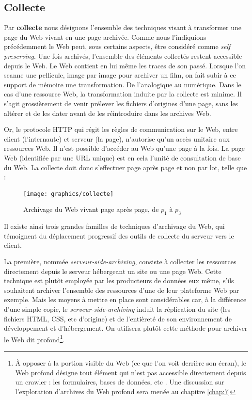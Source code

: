 \documentclass[symmetric,justified,marginals=raggedouter]{tufte-book}
\begin{document}
\subsection{Collecte}

\noindent Par \textbf{collecte} nous désignons l'ensemble des techniques visant à transformer une page du Web vivant en une page archivée. Comme nous l'indiquions précédemment le Web peut, sous certains aspects, être considéré comme \textit{self preserving}. Une fois archivés, l'ensemble des éléments collectés restent accessible depuis le Web. Le Web contient en lui même les traces de son passé. Lorsque l'on scanne une pellicule, image par image pour archiver un film, on fait subir à ce support de mémoire une transformation. De l'analogique au numérique. Dans le cas d'une ressource Web, la transformation induite par la collecte est minime. Il s'agit grossièrement de venir prélever les fichiers d'origines d'une page, sans les altérer et de les dater avant de les réintroduire dans les archives Web.     

Or, le protocole HTTP qui régit les règles de communication sur le Web, entre client (l'internaute) et serveur (la page), n'autorise qu'un accès unitaire aux ressources Web. Il n'est possible d'accéder au Web qu'une page à la fois. La page Web (identifiée par une URL unique) est en cela l'unité de consultation de base du Web. La collecte doit donc s'effectuer page après page et non par lot, telle que :   

\begin{figure}%
  \texttt{[image: graphics/collecte]}
  \caption{Archivage du Web vivant page après page, de $p_1$ à $p_3$}
  \label{fig:collecte}
\end{figure} 

\noindent Il existe ainsi trois grandes familles de techniques d'archivage du Web, qui témoignent du déplacement progressif des outils de collecte du serveur vers le client. 

La première, nommée \textit{serveur-side-archiving}, consiste à collecter les ressources directement depuis le serveur hébergeant un site ou une page Web. Cette technique est plutôt employée par les producteurs de données eux même, s'ils souhaitent archiver l'ensemble des ressources d'une de leur plateforme Web par exemple. Mais les moyens à mettre en place sont considérables car, à la différence d'une simple copie, le \textit{serveur-side-archiving} induit la réplication du site (les fichiers HTML, CSS, etc d'origine) et de l'entièreté de son environnement de dévelop\-pement et d'hébergement. On utilisera plutôt cette méthode pour archiver le Web dit profond\footnote{À opposer à la portion visible du Web (ce que l'on voit derrière son écran), le Web profond désigne tout élément qui n'est pas accessible directement depuis un crawler : les formulaires, bases de données, etc \citep{lawrence_accessibility_2000}. Une discussion sur l'exploration d'archives du Web profond sera menée au chapitre \ref{chap:7}}.
\end{document}
